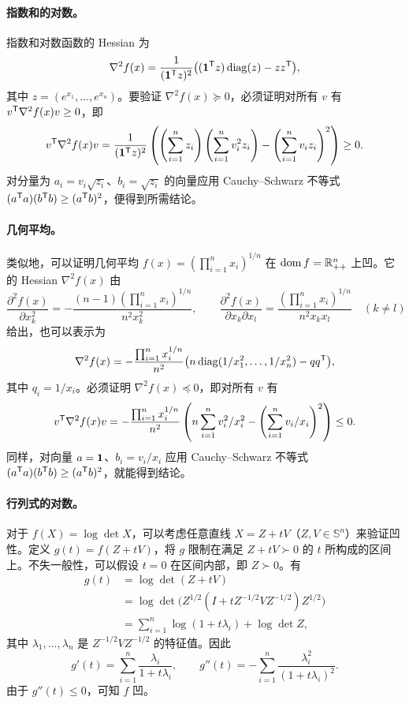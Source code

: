 \paragraph{指数和的对数。}指数和对数函数的 Hessian 为
\[
 \nabla^2 f(x)=\frac1{(\mathbf 1^\mathsf T z)^2}
 \bigl((\mathbf 1^\mathsf T z)\operatorname{diag}(z)-zz^\mathsf T\bigr),
\]
其中 $z=(e^{x_1},\ldots,e^{x_n})$。要验证 $\nabla^2f(x)\succeq0$，必须证明对所有 $v$ 有 $v^\mathsf T\nabla^2f(x)v\geq0$，即
\[
 v^\mathsf T\nabla^2f(x)v=\frac1{(\mathbf 1^\mathsf T z)^2}
 \left(\left(\sum_{i=1}^n z_i\right)\left(\sum_{i=1}^n v_i^2z_i\right)
 -\left(\sum_{i=1}^n v_iz_i\right)^2\right)\geq0.
\]
对分量为 $a_i=v_i\sqrt{z_i}$、$b_i=\sqrt{z_i}$ 的向量应用 Cauchy--Schwarz 不等式 $(a^\mathsf T a)(b^\mathsf T b)\geq(a^\mathsf T b)^2$，便得到所需结论。

\paragraph{几何平均。}类似地，可以证明几何平均 $f(x)=(\prod_{i=1}^n x_i)^{1/n}$ 在 $\operatorname{dom} f=\mathbb R_{++}^n$ 上凹。它的 Hessian $\nabla^2f(x)$ 由
\[
 \frac{\partial^2f(x)}{\partial x_k^2}
 =-\frac{(n-1)(\prod_{i=1}^n x_i)^{1/n}}{n^2x_k^2},\qquad
 \frac{\partial^2f(x)}{\partial x_k\partial x_l}
 =\frac{(\prod_{i=1}^n x_i)^{1/n}}{n^2x_kx_l}\quad(k\ne l)
\]
给出，也可以表示为
\[
 \nabla^2 f(x)=-\frac{\prod_{i=1}^n x_i^{1/n}}{n^2}
 \bigl(n\operatorname{diag}(1/x_1^2,\ldots,1/x_n^2)-qq^\mathsf T\bigr),
\]
其中 $q_i=1/x_i$。必须证明 $\nabla^2f(x)\preceq0$，即对所有 $v$ 有
\[
 v^\mathsf T\nabla^2f(x)v=-\frac{\prod_{i=1}^n x_i^{1/n}}{n^2}
 \left(n\sum_{i=1}^n v_i^2/x_i^2-\left(\sum_{i=1}^n v_i/x_i\right)^2\right)\leq0.
\]
同样，对向量 $a=\mathbf 1$、$b_i=v_i/x_i$ 应用 Cauchy--Schwarz 不等式 $(a^\mathsf T a)(b^\mathsf T b)\geq(a^\mathsf T b)^2$，就能得到结论。

\paragraph{行列式的对数。}对于 $f(X)=\log\det X$，可以考虑任意直线 $X=Z+tV$（$Z,V\in\mathbb S^n$）来验证凹性。定义 $g(t)=f(Z+tV)$，将 $g$ 限制在满足 $Z+tV\succ0$ 的 $t$ 所构成的区间上。不失一般性，可以假设 $t=0$ 在区间内部，即 $Z\succ0$。有
\[
\begin{aligned}
 g(t)&=\log\det(Z+tV)\\
 &=\log\det\bigl(Z^{1/2}(I+tZ^{-1/2}VZ^{-1/2})Z^{1/2}\bigr)\\
 &=\sum_{i=1}^n\log(1+t\lambda_i)+\log\det Z,
\end{aligned}
\]
其中 $\lambda_1,\ldots,\lambda_n$ 是 $Z^{-1/2}VZ^{-1/2}$ 的特征值。因此
\[
 g'(t)=\sum_{i=1}^n\frac{\lambda_i}{1+t\lambda_i},\qquad
 g''(t)=-\sum_{i=1}^n\frac{\lambda_i^2}{(1+t\lambda_i)^2}.
\]
由于 $g''(t)\leq0$，可知 $f$ 凹。

